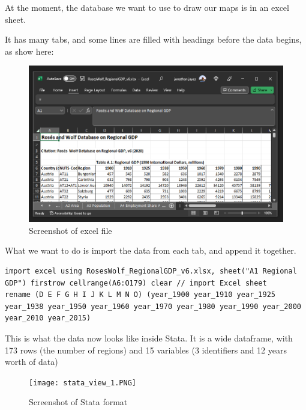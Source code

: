 \documentclass[
  letterpaper,
  DIV=11,
  numbers=noendperiod]{scrartcl}
\begin{document}
At the moment, the database we want to use to draw our maps is in an
excel sheet.

It has many tabs, and some lines are filled with headings before the
data begins, as show here:

\begin{figure}

{\centering \includegraphics{labs/Lab-1-resources/excel_format.PNG}

}

\caption{Screenshot of excel file}

\end{figure}

What we want to do is import the data from each tab, and append it
together.

\begin{verbatim}
import excel using RosesWolf_RegionalGDP_v6.xlsx, sheet("A1 Regional GDP") firstrow cellrange(A6:O179) clear // import Excel sheet
rename (D E F G H I J K L M N O) (year_1900 year_1910 year_1925 year_1938 year_1950 year_1960 year_1970 year_1980 year_1990 year_2000 year_2010 year_2015)
\end{verbatim}

This is what the data now looks like inside Stata. It is a wide
dataframe, with 173 rows (the number of regions) and 15 variables (3
identifiers and 12 years worth of data)

\begin{figure}

{\centering \texttt{[image: stata\_view\_1.PNG]}

}

\caption{Screenshot of Stata format}

\end{figure}
\end{document}
